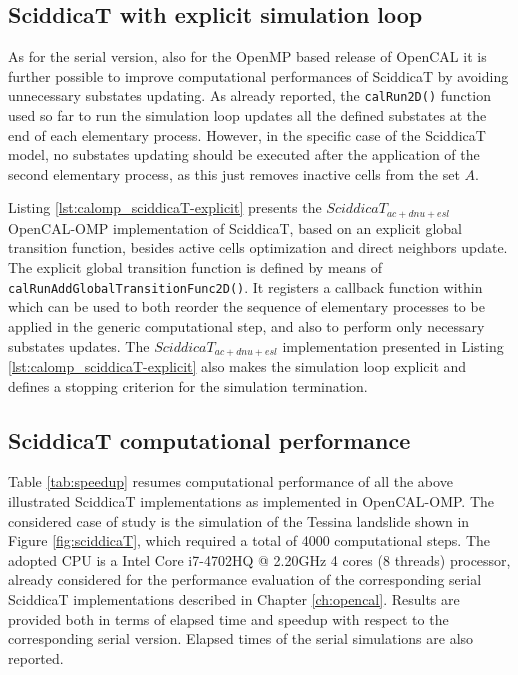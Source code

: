 \subsection{SciddicaT with explicit simulation loop}

As for the serial version, also for the OpenMP based release of
OpenCAL it is further possible to improve computational performances
of SciddicaT by avoiding unnecessary substates updating. As already
reported, the \verb'calRun2D()' function used so far to run the
simulation loop updates all the defined substates at the end of each
elementary process. However, in the specific case of the SciddicaT
model, no substates updating should be executed after the application
of the second elementary process, as this just removes inactive cells
from the set $A$.

Listing \ref{lst:calomp_sciddicaT-explicit} presents the
$SciddicaT_{ac+dnu+esl}$ OpenCAL-OMP implementation of SciddicaT,
based on an explicit global transition function, besides active cells
optimization and direct neighbors update. The explicit global
transition function is defined by means of
\verb'calRunAddGlobalTransitionFunc2D()'. It registers a callback
function within which can be used to both reorder the sequence of
elementary processes to be applied in the generic computational step,
and also to perform only necessary substates updates. The
$SciddicaT_{ac+dnu+esl}$ implementation presented in Listing
\ref{lst:calomp_sciddicaT-explicit} also makes the simulation loop
explicit and defines a stopping criterion for the simulation
termination.



\subsection{SciddicaT computational performance}

Table \ref{tab:speedup} resumes computational performance of all the
above illustrated SciddicaT implementations as implemented in
OpenCAL-OMP. The considered case of study is the simulation of the
Tessina landslide shown in Figure \ref{fig:sciddicaT}, which required
a total of 4000 computational steps. The adopted CPU is a Intel Core
i7-4702HQ @ 2.20GHz 4 cores (8 threads) processor, already considered
for the performance evaluation of the corresponding serial SciddicaT
implementations described in Chapter \ref{ch:opencal}. Results are
provided both in terms of elapsed time and speedup with respect to
the corresponding serial version. Elapsed times of the serial
simulations are also reported.

